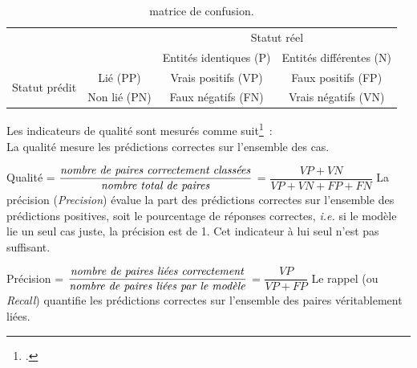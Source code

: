 \documentclass[a4paper,12pt,twoside]{book}
\begin{document}
			    \begin{table}[htbp]
                \begin{adjustbox}{width=1\textwidth,center=\textwidth}
                \settowidth\rotheadsize{}
                \renewcommand\cellalign{cl}
                \renewcommand\arraystretch{1.2}
			        \begin{tabular}{|c|c|c|c|}
			            \cline{3-4}
			            \multicolumn{2}{c}{}&\multicolumn{2}{|c|}{Statut réel}\\
			            \cline{3-4}
			            
                        \multicolumn{2}{c|}{}&Entités identiques (P) & Entités différentes (N)\\
                        \hline
                        \multirow{2}{*}{Statut prédit}&Lié (PP)&\cellcolor{green!10!white}Vrais positifs (VP)&\cellcolor{red!10!white}Faux positifs (FP)\\
                        \cline{2-4}
                        &Non lié (PN)&\cellcolor{red!10!white}Faux négatifs (FN)&\cellcolor{green!10!white}Vrais négatifs (VN)\\ \hline 
                    \end{tabular}
                    \end{adjustbox}
                \caption{matrice de confusion.}\label{tab3}
			    \end{table}
			    \vspace{-0.8em}
			    
			    Les indicateurs de qualité sont mesurés comme suit\footcite{SensitivitySpecificity2022}~:
			    \\
			    La qualité mesure les prédictions correctes sur l'ensemble des cas.
			    \vspace{0.8em}
			    
			    Qualité = $ \dfrac{\mbox{\textit{nombre de paires correctement classées}}}{\mbox{\textit{nombre total de paires}}} $ = $ \dfrac{VP + VN}{VP + VN + FP + FN} $
			    \newline
			    \newline
			    La précision (\textit{Precision}) évalue la part des prédictions correctes sur l'ensemble des prédictions positives, soit le pourcentage de réponses correctes, \textit{i.e.} si le modèle lie un seul cas juste, la précision est de 1. Cet indicateur à lui seul n'est pas suffisant.
			    \newline
			    
			    Précision = $ \dfrac{\mbox{\textit{nombre de paires liées correctement}}}{\mbox{\textit{nombre de paires liées par le modèle}}} $ = $ \dfrac{VP}{VP + FP} $
			    \newline
			    \newline
			    Le rappel (ou \textit{Recall}) quantifie les prédictions correctes sur l'ensemble des paires véritablement liées.
			    \newline
			    
\end{document}
